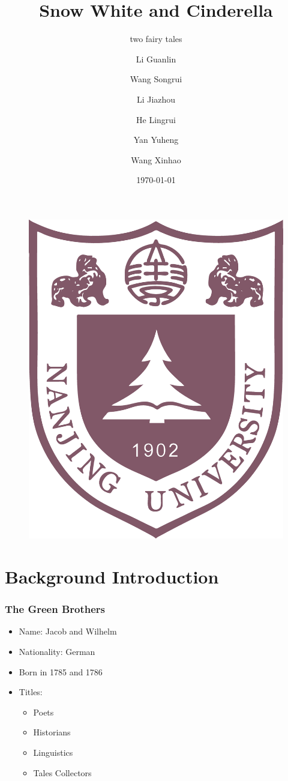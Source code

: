 \documentclass{beamer}
\title[Reflection on Snow White and Cinderella]
{Snow White and Cinderella}
\subtitle{two fairy tales}
\author[Eric, Richard] %
{Li Guanlin\inst{1} \and Wang Songrui\inst{1} \and Li Jiazhou\inst{1} \and He Lingrui\inst{1} \and Yan Yuheng\inst{1} \and Wang Xinhao\inst{1}}
\institute[NJU] %
{
    \inst{1}%
    Undeegraduate in ICS\\
    Nanjing University
}
\date[NJU 2023] %
{\today}
\begin{document}
\begin{frame}
    \titlepage
    \begin{figure}[htpb]
        \begin{center}
            \includegraphics[width=0.2\linewidth]{pic/NJU_Logo.eps}
        \end{center}
    \end{figure}
\end{frame}

\begin{frame}
    \tableofcontents[sectionstyle=show,subsectionstyle=show/shaded/hide,subsubsectionstyle=show/shaded/hide]
\end{frame}

\section{Background Introduction}
\begin{frame}
    \frametitle{The Green Brothers}
    \begin{itemize}
        \item<1-> Name: Jacob and Wilhelm
        \item<2-> Nationality: German
        \item<3-> Born in 1785 and 1786
        \item<4-> Titles:
            \begin{itemize}
                \item Poets
                \item Historians
                \item Linguistics
                \item \alert{Tales Collectors}
            \end{itemize}
    \end{itemize}
\end{frame}
\end{document}
